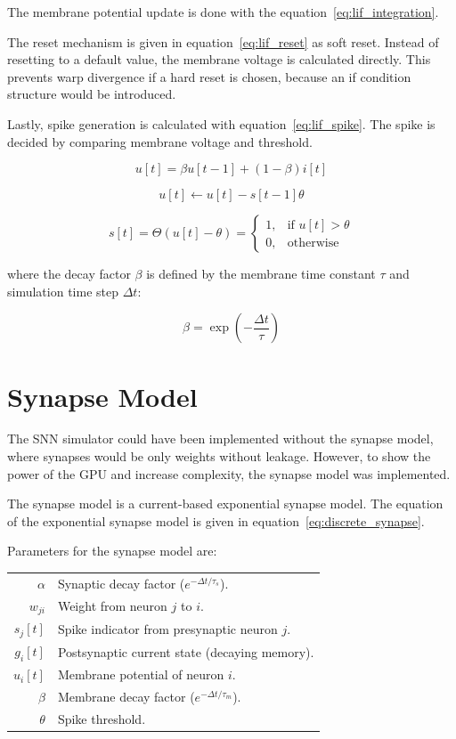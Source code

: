 \documentclass[conference]{IEEEtran}
\begin{document}
The membrane potential update is done with the equation~\ref{eq:lif_integration}.

The reset mechanism is given in equation~\ref{eq:lif_reset} as soft reset. Instead of resetting to a default value, the membrane voltage is calculated directly. This prevents warp divergence if a hard reset is chosen, because an if condition structure would be introduced.

Lastly, spike generation is calculated with equation~\ref{eq:lif_spike}. The spike is decided by comparing membrane voltage and threshold.

\begin{equation}
u[t] = \beta u[t-1] + (1 - \beta) i[t]
\label{eq:lif_integration}
\end{equation}

\begin{equation}
u[t] \leftarrow u[t] - s[t-1]\theta
\label{eq:lif_reset}
\end{equation}

\begin{equation}
s[t] = \Theta(u[t] - \theta) =
\begin{cases}
1, & \text{if } u[t] > \theta \\
0, & \text{otherwise}
\end{cases}
\label{eq:lif_spike}
\end{equation}

where the decay factor $\beta$ is defined by the membrane time constant $\tau$ and simulation time step $\Delta t$:

\begin{equation}
\beta = \exp\left(-\frac{\Delta t}{\tau}\right)
\end{equation}

\section{Synapse Model}

The SNN simulator could have been implemented without the synapse model, where synapses would be only weights without leakage. However, to show the power of the GPU and increase complexity, the synapse model was implemented.

The synapse model is a current-based exponential synapse model. The equation of the exponential synapse model is given in equation~\ref{eq:discrete_synapse}.

Parameters for the synapse model are:

\begin{tabular}{r l}
  $\alpha$ & Synaptic decay factor ($e^{-\Delta t / \tau_s}$). \\[0.5em]
  $w_{ji}$ & Weight from neuron $j$ to $i$. \\[0.5em]
  $s_j[t]$ & Spike indicator from presynaptic neuron $j$. \\[0.5em]
  $g_i[t]$ & Postsynaptic current state (decaying memory). \\[0.5em]
  $u_i[t]$ & Membrane potential of neuron $i$. \\[0.5em]
  $\beta$ & Membrane decay factor ($e^{-\Delta t / \tau_m}$). \\[0.5em]
  $\theta$ & Spike threshold.
\end{tabular}
\end{document}

